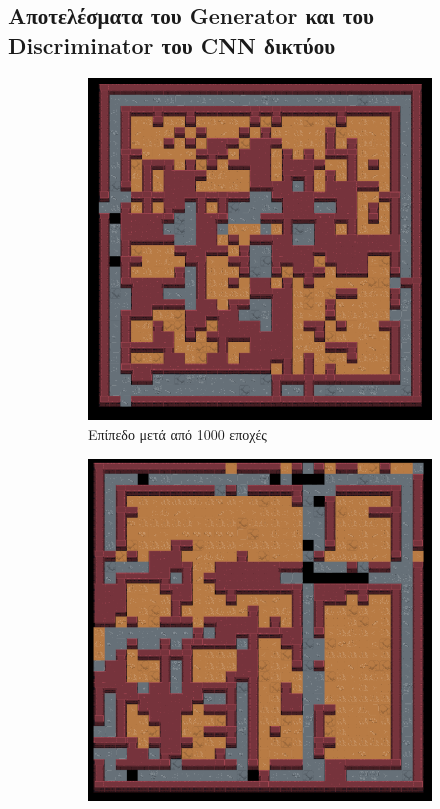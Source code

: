\subsection{Αποτελέσματα του Generator και του Discriminator του CNN δικτύου}
\begin{figure}[H]
\begin{subfigure}{.5\textwidth}
  \centering
  \includegraphics[width=.8\linewidth]{../images/result_images/cnn-gan/combined_1000.png}
  \caption{Επίπεδο μετά από 1000 εποχές}
  \label{fig:sfig1}
\end{subfigure}%
\begin{subfigure}{.5\textwidth}
  \centering
  \includegraphics[width=.8\linewidth]{../images/result_images/cnn-gan/combined_3000.png}

\end{subfigure}
\end{figure}
